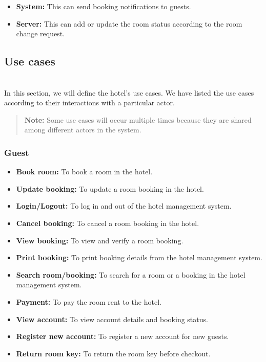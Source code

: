 \begin{itemize}
\item
\protect{}\label{kQ2F4MKvmKO6x4mBZaOKM}
\textbf{System:} This can send booking notifications to guests.
\item
\protect{}\label{p53MzU5d3pBjGC2a_bvrW}
\textbf{Server:} This can add or update the room status according to the room change request.
\end{itemize}

\subsection{Use cases}\label{nO_RhIIJT6X1kaHvgcQtw}
\\
In this section, we will define the hotel's use cases. We have listed the use cases according to their interactions with a particular actor.
\begin{quote}
\textbf{Note:} Some use cases will occur multiple times because they are shared among different actors in the system.
\end{quote}
\subsubsection{Guest}\label{CNYaQrJCb9kIhrJtDEpQJ}

\begin{itemize}
\item
\textbf{Book room:} To book a room in the hotel.
\item
\textbf{Update booking:} To update a room booking in the hotel.
\item
\textbf{Login/Logout:} To log in and out of the hotel management system.
\item
\textbf{Cancel booking:} To cancel a room booking in the hotel.
\item
\textbf{View booking:} To view and verify a room booking.
\item
\textbf{Print booking:} To print booking details from the hotel management system.
\item
\textbf{Search room/booking:} To search for a room or a booking in the hotel management system.
\item
\textbf{Payment:} To pay the room rent to the hotel.
\item
\textbf{View account:} To view account details and booking status.
\item
\textbf{Register new account:} To register a new account for new guests.
\item
\protect{}\label{3-d8_8g0-eBA39t05upol}
\textbf{Return room key:} To return the room key before checkout.
\end{itemize}

